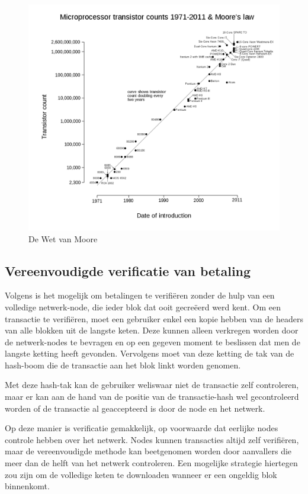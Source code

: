 		\begin{figure}
			\includegraphics[width=\linewidth]{img/moore.png}
			\caption{De Wet van Moore ~\autocite{Wgsimon2011}}
			\label{fig:moore}
		\end{figure}
		
		\subsection{Vereenvoudigde verificatie van betaling}
		Volgens \textcite{Nakamoto2008} is het mogelijk om betalingen te verifiëren zonder de hulp van een volledige netwerk-node, die ieder blok dat ooit gecreëerd werd kent. Om een transactie te verifiëren, moet een gebruiker enkel een kopie hebben van de headers van alle blokken uit de langste keten. Deze kunnen alleen verkregen worden door de netwerk-nodes te bevragen en op een gegeven moment te beslissen dat men de langste ketting heeft gevonden. Vervolgens moet van deze ketting de tak van de hash-boom die de transactie aan het blok linkt worden genomen. ~\autocite{Nakamoto2008}
	
		Met deze hash-tak kan de gebruiker weliswaar niet de transactie zelf controleren, maar er kan aan de hand van de positie van de transactie-hash wel gecontroleerd worden of de transactie al geaccepteerd is door de node en het netwerk. ~\autocite{Nakamoto2008}
		
		Op deze manier is verificatie gemakkelijk, op voorwaarde dat eerlijke nodes controle hebben over het netwerk. Nodes kunnen transacties altijd zelf verifiëren, maar de vereenvoudigde methode kan beetgenomen worden door aanvallers die meer dan de helft van het netwerk controleren. Een mogelijke strategie hiertegen zou zijn om de volledige keten te downloaden wanneer er een ongeldig blok binnenkomt.  ~\autocite{Nakamoto2008}
